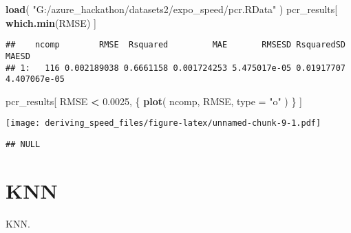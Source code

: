 \documentclass[]{article}
\newenvironment{Shaded}{\begin{snugshade}}{\end{snugshade}}
\newcommand{\DataTypeTok}[1]{\textcolor[rgb]{0.13,0.29,0.53}{#1}}
\newcommand{\DecValTok}[1]{\textcolor[rgb]{0.00,0.00,0.81}{#1}}
\newcommand{\FloatTok}[1]{\textcolor[rgb]{0.00,0.00,0.81}{#1}}
\newcommand{\KeywordTok}[1]{\textcolor[rgb]{0.13,0.29,0.53}{\textbf{#1}}}
\newcommand{\NormalTok}[1]{#1}
\newcommand{\OperatorTok}[1]{\textcolor[rgb]{0.81,0.36,0.00}{\textbf{#1}}}
\newcommand{\StringTok}[1]{\textcolor[rgb]{0.31,0.60,0.02}{#1}}
\begin{document}
\begin{Shaded}
\begin{Highlighting}[]
\KeywordTok{load}\NormalTok{( }\StringTok{"G:/azure_hackathon/datasets2/expo_speed/pcr.RData"}\NormalTok{ )}
\NormalTok{pcr_results[ }\KeywordTok{which.min}\NormalTok{(RMSE) ]}
\end{Highlighting}
\end{Shaded}

\begin{verbatim}
##    ncomp        RMSE  Rsquared         MAE       RMSESD RsquaredSD        MAESD
## 1:   116 0.002189038 0.6661158 0.001724253 5.475017e-05 0.01917707 4.407067e-05
\end{verbatim}

\begin{Shaded}
\begin{Highlighting}[]
\NormalTok{pcr_results[ RMSE }\OperatorTok{<}\StringTok{ }\FloatTok{0.0025}\NormalTok{, \{}
    \KeywordTok{plot}\NormalTok{( ncomp, RMSE, }\DataTypeTok{type =} \StringTok{"o"}\NormalTok{ )}
\NormalTok{\} ]}
\end{Highlighting}
\end{Shaded}

\texttt{[image: deriving\_speed\_files/figure-latex/unnamed-chunk-9-1.pdf]}

\begin{verbatim}
## NULL
\end{verbatim}

\hypertarget{knn}{%
\section{KNN}\label{knn}}

KNN.

\begin{Shaded}
\end{Shaded}
\end{document}
